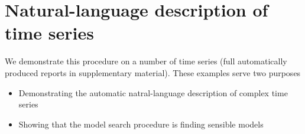 \documentclass{article}
\begin{document}
\section{Natural-language description of time series}
\label{sec:examples}

We demonstrate this procedure on a number of time series (full automatically produced reports in supplementary material).
These examples serve two purposes
\begin{itemize}
  \item Demonstrating the automatic natral-language description of complex time series
  \item Showing that the model search procedure is finding sensible models
\end{itemize}

%
%
%
%
%
%
\end{document}
